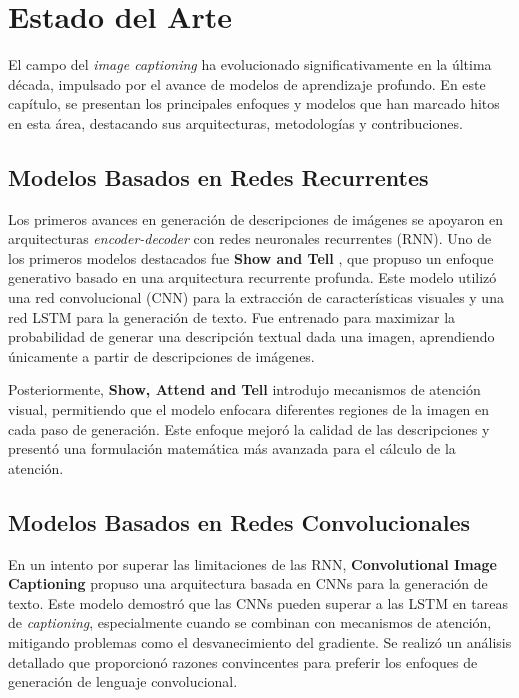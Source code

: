  
\chapter{Estado del Arte}\label{chapter:estadoarte}

El campo del \textit{image captioning} ha evolucionado significativamente en la última década, impulsado por el avance de modelos de aprendizaje profundo. En este capítulo, se presentan los principales enfoques y modelos que han marcado hitos en esta área, destacando sus arquitecturas, metodologías y contribuciones.

\section{Modelos Basados en Redes Recurrentes}

Los primeros avances en generación de descripciones de imágenes se apoyaron en arquitecturas \textit{encoder-decoder} con redes neuronales recurrentes (RNN). Uno de los primeros modelos destacados fue \textbf{Show and Tell} \cite{vinyals2015show}, que propuso un enfoque generativo basado en una arquitectura recurrente profunda. Este modelo utilizó una red convolucional (CNN) para la extracción de características visuales y una red LSTM para la generación de texto. Fue entrenado para maximizar la probabilidad de generar una descripción textual dada una imagen, aprendiendo únicamente a partir de descripciones de imágenes.

Posteriormente, \textbf{Show, Attend and Tell} \cite{xu2015show} introdujo mecanismos de atención visual, permitiendo que el modelo enfocara diferentes regiones de la imagen en cada paso de generación. Este enfoque mejoró la calidad de las descripciones y presentó una formulación matemática más avanzada para el cálculo de la atención.

\section{Modelos Basados en Redes Convolucionales}

En un intento por superar las limitaciones de las RNN, \textbf{Convolutional Image Captioning} \cite{aneja2018convcap} propuso una arquitectura basada en CNNs para la generación de texto. Este modelo demostró que las CNNs pueden superar a las LSTM en tareas de \textit{captioning}, especialmente cuando se combinan con mecanismos de atención, mitigando problemas como el desvanecimiento del gradiente. Se realizó un análisis detallado que proporcionó razones convincentes para preferir los enfoques de generación de lenguaje convolucional. 


